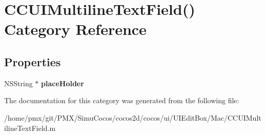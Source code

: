 \hypertarget{categoryCCUIMultilineTextField_07_08}{}\section{C\+C\+U\+I\+Multiline\+Text\+Field() Category Reference}
\label{categoryCCUIMultilineTextField_07_08}
\subsection*{Properties}
\begin{DoxyCompactItemize}
\item 
\mbox{\label{categoryCCUIMultilineTextField_07_08_a1b9e4cbcad2d34e7d61f3c70b48648c8}} 
N\+S\+String $\ast$ {\bfseries place\+Holder}
\end{DoxyCompactItemize}


The documentation for this category was generated from the following file\+:\begin{DoxyCompactItemize}
\item 
/home/pmx/git/\+P\+M\+X/\+Simu\+Cocos/cocos2d/cocos/ui/\+U\+I\+Edit\+Box/\+Mac/C\+C\+U\+I\+Multiline\+Text\+Field.\+m\end{DoxyCompactItemize}
